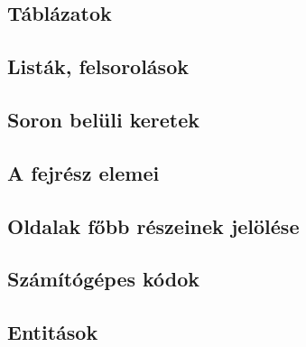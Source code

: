 \documentclass[usenames,dvipsnames,aspectratio=169]{beamer}
\begin{document}


\subsection{Táblázatok}



\subsection{Listák, felsorolások}



\subsection{Soron belüli keretek}



\subsection{A fejrész elemei}



\subsection{Oldalak főbb részeinek jelölése}



\subsection{Számítógépes kódok}



\subsection{Entitások}


\end{document}
